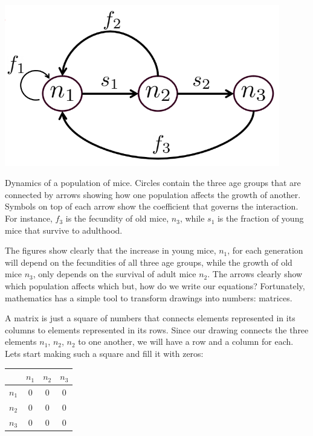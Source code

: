 \documentclass{tufte-book} %
\begin{document}
\begin{marginfigure}
	\begin{center}
		\includegraphics[width=0.9\textwidth]{Mouse_pop_graph}
	\end{center}
	\caption{Dynamics of a population of mice. Circles contain the three age groups that are connected by arrows showing how one population affects the growth of another. Symbols on top of each arrow show the coefficient that governs the interaction. For instance, $f_3$ is the fecundity of old mice, $n_3$, while $s_1$ is the fraction of young mice that survive to adulthood.}
	\label{fig:mice}
\end{marginfigure}
 
The figures show clearly that the increase in young mice, $n_1$, for each generation will depend on the fecundities of all three age groups, while the growth of old mice $n_3$, only depends on the survival of adult mice $n_2$. The arrows clearly show which population affects which but, how do we write our equations? Fortunately, mathematics has a simple tool to transform drawings into numbers: matrices.

A matrix is just a square of numbers that connects elements represented in its columns to elements represented in its rows. Since our drawing connects the three elements $n_1$, $n_2$, $n_2$ to one another, we will have a row and a column for each. Lets start making such a square and fill it with zeros:

\begin{center}
\begin{tabular}{c|ccc}
	& $n_1$ & $n_2$ & $n_3$ \\
	\hline 
	$n_1$ &0	&0	&0	\\
	$n_2$ &0	&0	&0	\\
	$n_3$ &0	&0	&0	\\
\end{tabular}
\end{center}
\end{document}
